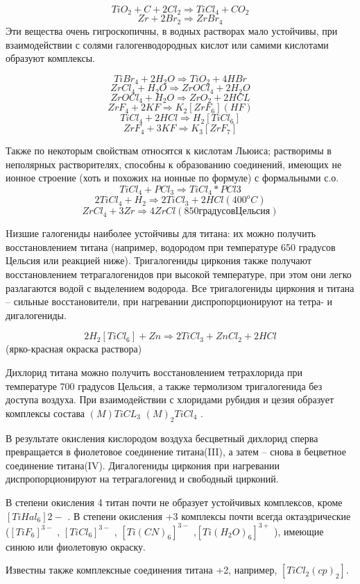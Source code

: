 \documentclass[11pt]{article}
\begin{document}
$$TiO _2 + C + 2Cl _2 \Rightarrow TiCl _4 + CO _2$$
$$Zr + 2Br_2 \Rightarrow ZrBr _4$$
Эти вещества очень гигроскопичны, в водных растворах мало устойчивы, при
взаимодействии с солями галогенводородных кислот или самими кислотами образуют
комплексы.

$$TiBr _4 + 2H _2 O \Rightarrow TiO _2 + 4HBr$$
$$ZrCl _4 + H _2 O \Rightarrow ZrOCl _4 + 2H _2 O$$
$$ZrOCl _4 + H _2 O \Rightarrow ZrO _2 + 2HCL$$
$$ZrF _4 + 2KF \Rightarrow K _2 [ZrF _6 ] (HF)$$
$$TiCl _4 + 2HCl \Rightarrow H _2 [TiCl _6 ]$$
$$ZrF _4 + 3KF \Rightarrow K _3 [ZrF _7 ]$$

Также по некоторым свойствам относятся к кислотам Льюиса; растворимы в неполярных
растворителях, способны к образованию соединений, имеющих не ионное строение (хоть
и похожих на ионные по формуле) с формальными с.о.
$$TiCl _4 + PCl _3 \Rightarrow TiCl_4 *PCl 3$$
$$2TiCl _4 + H _2 \Rightarrow 2TiCl _3 + 2HCl (400^o C )$$
$$ZrCl _4 + 3Zr \Rightarrow 4ZrCl (850 градусов Цельсия)$$

Hизшие галогениды наиболее устойчивы для титана: их можно получить восстановлением
титана (например, водородом при температуре 650 градусов Цельсия или реакцией
ниже). Тригалогениды циркония также получают восстановлением тетрагалогенидов при
высокой температуре, при этом они легко разлагаются водой с выделением водорода.
Все тригалогениды циркония и титана – сильные восстановители, при нагревании
диспропорционируют на тетра- и дигалогениды.

$$2H _2 [TiCl _6 ] + Zn \Rightarrow 2TiCl _3 + ZnCl _2 + 2HCl$$
(ярко-красная окраска раствора)

Дихлорид титана можно получить восстановлением тетрахлорида при температуре 700
градусов Цельсия, а также термолизом тригалогенида без доступа воздуха. При
взаимодействии с хлоридами рубидия и цезия образует комплексы состава $(M)TiCL _3$
$(M)_2 TiCl _4$ .

 В результате окисления кислородом воздуха бесцветный дихлорид сперва
превращается в фиолетовое соединение титана(III), а затем – снова в бецветное
соединение титана(IV). Дигалогениды циркония при нагревании диспропорционируют на
тетрагалогенид и свободный цирконий.

В степени окисления 4 титан почти не образует устойчивых комплексов, кроме $[TiHal _6 ] {2-}$ . В
степени окисления +3 комплексы почти всегда октаэдрические ($[TiF _6 ] ^{3-}$ , $[TiCl _6 ] ^{3-}$ , $[Ti(CN) _6 ] ^{3-}$ ,$[Ti(H_2O) _6 ] ^{3+}$ ), имеющие синюю или фиолетовую окраску. 

Известны также комплексные
соединения титана +2, например, $[TiCl _2 (cp) _2 ]$.
\end{document}
